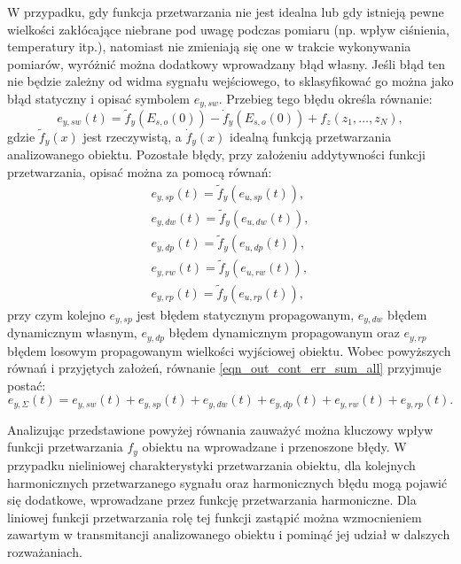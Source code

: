 W przypadku, gdy funkcja przetwarzania nie jest idealna lub gdy istnieją pewne wielkości zakłócające niebrane pod uwagę podczas pomiaru (np. wpływ ciśnienia, temperatury itp.), natomiast nie zmieniają się one w trakcie wykonywania pomiarów, wyróżnić można dodatkowy wprowadzany błąd własny. Jeśli błąd ten nie będzie zależny od widma sygnału wejściowego, to sklasyfikować go można jako błąd statyczny i opisać symbolem $e_{y,sw}$. Przebieg tego błędu określa równanie:
\begin{equation}
e_{y,sw} \left( t \right) = \tilde{f}_{y} \left( E_{s,o} \left( 0 \right) \right) - \dot{f}_{y} \left( E_{s,o} \left( 0 \right) \right) + f_{z} \left( z_{1}, \hdots, z_{N} \right) \label{eqn_out_cont_err_stat_self},
\end{equation}
gdzie $\tilde{f}_{y}(x)$ jest rzeczywistą, a $\dot{f}_{y}(x)$ idealną funkcją przetwarzania analizowanego obiektu. Pozostałe błędy, przy założeniu addytywności funkcji przetwarzania, opisać można za pomocą równań:
\begin{gather}
e_{y,sp} \left( t \right) = \tilde{f}_{y} \left( e_{u,sp} \left( t \right) \right) \label{eqn_out_cont_err_stat_prop}, \\
e_{y,dw} \left( t \right) = \tilde{f}_{y} \left( e_{u,dw} \left( t \right) \right) \label{eqn_out_cont_err_dyn_prop}, \\
e_{y,dp} \left( t \right) = \tilde{f}_{y} \left( e_{u,dp} \left( t \right) \right) \label{eqn_out_cont_err_dyn_self}, \\
e_{y,rw} \left( t \right) = \tilde{f}_{y} \left( e_{u,rw} \left( t \right) \right) \label{eqn_out_cont_err_rand_self}, \\
e_{y,rp} \left( t \right) = \tilde{f}_{y} \left( e_{u,rp} \left( t \right) \right) \label{eqn_out_cont_err_rand_prop},
\end{gather}
przy czym kolejno $e_{y,sp}$ jest błędem statycznym propagowanym, $e_{y,dw}$ błędem dynamicznym własnym, $e_{y,dp}$ błędem dynamicznym propagowanym oraz $e_{y,rp}$ błędem losowym propagowanym wielkości wyjściowej obiektu. Wobec powyższych równań i przyjętych założeń, równanie \eqref{eqn_out_cont_err_sum_all} przyjmuje postać:
\begin{equation}
e_{y,\Sigma} \left( t \right) = e_{y,sw} \left( t \right) + e_{y,sp} \left( t \right) + e_{y,dw} \left( t \right) + e_{y,dp} \left( t \right) + e_{y,rw} \left( t \right) + e_{y,rp} \left( t \right) \label{eqn_out_cont_err_sum_add}.
\end{equation}

Analizując przedstawione powyżej równania zauważyć można kluczowy wpływ funkcji przetwarzania $f_{y}$ obiektu na wprowadzane i przenoszone błędy. W przypadku nieliniowej charakterystyki przetwarzania obiektu, dla kolejnych harmonicznych przetwarzanego sygnału oraz harmonicznych błędu mogą pojawić się dodatkowe, wprowadzane przez funkcję przetwarzania harmoniczne. Dla liniowej funkcji przetwarzania rolę tej funkcji zastąpić można wzmocnieniem zawartym w transmitancji analizowanego obiektu i pominąć jej udział w dalszych rozważaniach.

